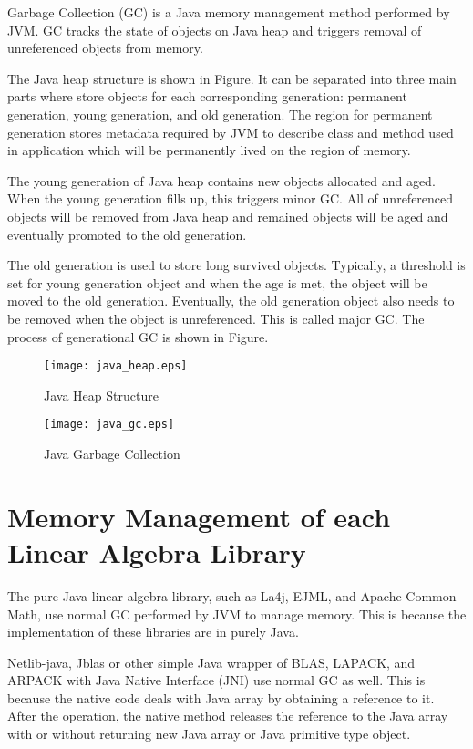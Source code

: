 Garbage Collection (GC) is a Java memory management method performed by JVM. 
GC tracks the state of objects on Java heap and triggers removal of unreferenced objects from memory. 

The Java heap structure is shown in Figure. It can be separated into three main parts where store objects for each corresponding generation: 
permanent generation, young generation, and old generation. The region for permanent generation stores metadata required by JVM to describe 
class and method used in application which will be permanently lived on the region of memory. 

The young generation of Java heap contains new objects allocated and aged. When the young generation fills up, this triggers minor GC. 
All of unreferenced objects will be removed from Java heap and remained objects will be aged and eventually promoted to the old generation.

The old generation is used to store long survived objects. Typically, a threshold is set for young generation object and when the age is met, 
the object will be moved to the old generation. Eventually, the old generation object also needs to be removed when the object is unreferenced. 
This is called major GC. The process of generational GC is shown in Figure.

\begin{figure}[htb]
    \texttt{[image: java\_heap.eps]}
    \caption{Java Heap Structure}
    \label{fig:Sampling}
\end{figure}


\begin{figure}[htb]
    \texttt{[image: java\_gc.eps]}
    \caption{Java Garbage Collection}
    \label{fig:Sampling}
\end{figure}



\section{Memory Management of each Linear Algebra Library}
\label{sec:history}

The pure Java linear algebra library, such as La4j, EJML, and Apache Common Math, 
use normal GC performed by JVM to manage memory. This is because the implementation of these libraries are in purely Java.

Netlib-java, Jblas or other simple Java wrapper of BLAS, LAPACK, and ARPACK with Java Native Interface (JNI) use normal GC as well. 
This is because the native code deals with Java array by obtaining a reference to it. After the operation, 
the native method releases the reference to the Java array with or without returning new Java array or Java primitive type object. 

